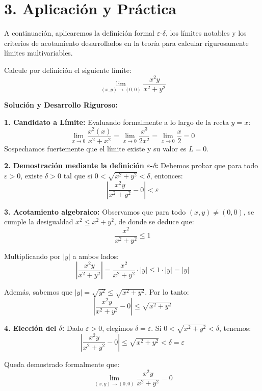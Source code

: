 \documentclass[11pt]{article}
\newenvironment{aplicacion}{%
  \section*{3. Aplicación y Práctica}%
}{}
\newenvironment{ejemplo}[1]{%
  \begin{tcolorbox}[colback=white,colframe=gray!40,title=Ejemplo: #1]%
}{%
  \end{tcolorbox}%
}
\begin{document}
\begin{aplicacion}
  A continuación, aplicaremos la definición formal $\varepsilon$-$\delta$, los límites notables y los criterios de acotamiento desarrollados en la teoría para calcular rigurosamente límites multivariables.

  \begin{ejemplo}{Demostración por Definición $\varepsilon$-$\delta$}
    Calcule por definición el siguiente límite:
    $$ \lim_{(x,y) \to (0,0)} \dfrac{x^2 y}{x^2 + y^2} $$

    \textbf{Solución y Desarrollo Riguroso:}
    
    \textbf{1. Candidato a Límite:}
    Evaluando formalmente a lo largo de la recta $y = x$:
    $$ \lim_{x \to 0} \dfrac{x^2 (x)}{x^2 + x^2} = \lim_{x \to 0} \dfrac{x^3}{2x^2} = \lim_{x \to 0} \dfrac{x}{2} = 0 $$
    Sospechamos fuertemente que el límite existe y su valor es $L = 0$.

    \textbf{2. Demostración mediante la definición $\varepsilon$-$\delta$:}
    Debemos probar que para todo $\varepsilon > 0$, existe $\delta > 0$ tal que si $0 < \sqrt{x^2 + y^2} < \delta$, entonces:
    $$ \left| \dfrac{x^2 y}{x^2 + y^2} - 0 \right| < \varepsilon $$

    \textbf{3. Acotamiento algebraico:}
    Observamos que para todo $(x,y) \neq (0,0)$, se cumple la desigualdad $x^2 \leq x^2 + y^2$, de donde se deduce que:
    $$ \dfrac{x^2}{x^2 + y^2} \leq 1 $$

    Multiplicando por $|y|$ a ambos lados:
    $$ \left| \dfrac{x^2 y}{x^2 + y^2} \right| = \dfrac{x^2}{x^2 + y^2} \cdot |y| \leq 1 \cdot |y| = |y| $$

    Además, sabemos que $|y| = \sqrt{y^2} \leq \sqrt{x^2 + y^2}$. Por lo tanto:
    $$ \left| \dfrac{x^2 y}{x^2 + y^2} - 0 \right| \leq \sqrt{x^2 + y^2} $$

    \textbf{4. Elección del $\delta$:}
    Dado $\varepsilon > 0$, elegimos $\delta = \varepsilon$. Si $0 < \sqrt{x^2 + y^2} < \delta$, tenemos:
    $$ \left| \dfrac{x^2 y}{x^2 + y^2} - 0 \right| \leq \sqrt{x^2 + y^2} < \delta = \varepsilon $$

    Queda demostrado formalmente que:
    $$ \lim_{(x,y) \to (0,0)} \dfrac{x^2 y}{x^2 + y^2} = 0 $$
  \end{ejemplo}


\end{aplicacion}
\end{document}
